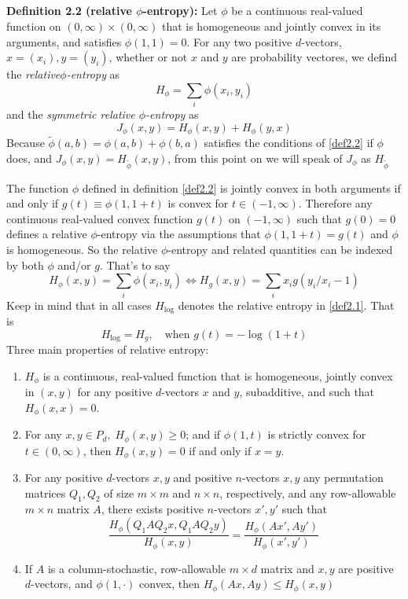 \subsection*{}
\noindent\textbf{Definition 2.2 (relative $\phi$-entropy):}\label{def2.2} Let $\phi$ be a continuous real-valued function on $(0, \infty) \times (0, \infty)$ that is homogeneous and jointly convex in its arguments, and satisfies $\phi (1,1) = 0$. For any two positive $d$-vectors, $x = (x_i), y=(y_i)$, whether or not $x$ and $y$ are probability vectores, we defind the \textit{relative}$\phi$\textit{-entropy} as
\[H_\phi = \sum_i\phi(x_i,y_i)\] and the \textit{symmetric relative $\phi$-entropy} as 
\[J_\phi(x,y) = H_\phi(x,y) + H_\phi(y,x)\]
Because $\tilde{\phi}(a,b) = \phi(a,b) + \phi(b,a)$ satisfies the conditions of \ref{def2.2} if $\phi$ does, and $J_\phi(x,y) = H_{\tilde{\phi}}(x,y)$, from this point on we will speak of $J_\phi$ as $H_{\tilde{\phi}}$ 
\par The function $\phi$ defined in definition \ref{def2.2} is jointly convex in both arguments if and only if $g(t)\equiv \phi(1,1+t)$ is convex for $t \in (-1, \infty)$. Therefore any continuous real-valued convex function $g(t)$ on $(-1, \infty)$ such that $g(0)=0$ defines a relative $\phi$-entropy via the assumptions that $\phi(1,1+t) = g(t)$ and $\phi$ is homogeneous. So the relative $\phi$-entropy and related quantities can be indexed by both $\phi$ and/or $g$. That's to say \[H_\phi(x,y)=\sum_i\phi(x_i,y_i) \iff H_g(x,y) = \sum_i x_ig(y_i/x_i - 1)\]  
Keep in mind that in all cases $H_{\log}$ denotes the relative entropy in \ref{def2.1}. That is \[H_{\log} = H_g, \quad \text{when } g(t) = -\log(1+t)\] 
Three main properties of relative entropy:
\begin{enumerate}
    \item $H_\phi$ is a continuous, real-valued function that is homogeneous, jointly convex in $(x,y)$ for any positive $d$-vectors $x$ and $y$, subadditive, and such that $H_\phi(x,x) = 0$.
    \item \label{rhp2} For any $x,y \in P_d, \; H_\phi(x,y) \geq 0$; and if $\phi(1,t)$ is strictly convex for $t \in (0, \infty)$, then $H_\phi(x,y) = 0$ if and only if $x = y$.
    \item For any positive $d$-vectors $x,y$ and positive $n$-vectors $x,y$ any permutation matrices $Q_1, Q_2$ of size $m \times m$ and $n \times n$, respectively, and any row-allowable $m\times n$ matrix $A$, there exists positive $n$-vectors $x', y'$ such that \[\frac{H_\phi(Q_1 A Q_2 x, Q_1 A Q_2 y)}{H_\phi(x,y)} = \frac{H_\phi(Ax', Ay')}{H_\phi(x',y')}\]
    \item If $A$ is a column-stochastic, row-allowable $m \times d$ matrix and $x,y$ are positive $d$-vectors, and $\phi(1, \cdot)$ convex, then $H_\phi(Ax, Ay) \leq H_\phi (x,y)$
\end{enumerate}
